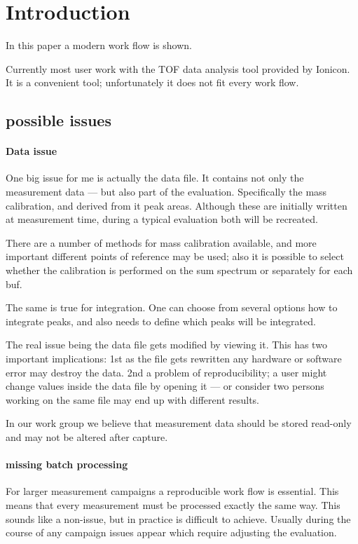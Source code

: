 \section{Introduction}

In this paper a modern work flow is shown.

Currently most user work with the TOF data analysis tool
\citep{Muller2013a} provided by Ionicon.  It is a convenient tool;
unfortunately it does not fit every work flow.

\subsection{possible issues}
\paragraph{Data issue}

One big issue for me is actually the data file.  It contains not only
the measurement data --- but also part of the evaluation.  Specifically
the mass calibration, and derived from it peak areas.   Although these
are initially written at measurement time, during a typical evaluation
both will be recreated.  

There are a number of methods for mass calibration available, and more
important different points of reference may be used; also it is possible
to select whether the calibration is performed on the sum spectrum or
separately for each buf. 

The same is true for integration.  One can choose from several options
how to integrate peaks, and also needs to define which peaks will be
integrated. 

The real issue being the data file gets modified by viewing it.  This
has two important implications: 1st as the file gets rewritten any
hardware or software error may destroy the data.  2nd a problem of
reproducibility; a user might change values inside the data file by
opening it --- or consider two persons working on the same file may end
up with different results.

In our work group we believe that measurement data should be stored
read-only and may not be altered after capture.


\paragraph{missing batch processing}

For larger measurement campaigns a reproducible work flow is essential.
This means that every measurement must be processed exactly the same
way.  This sounds like a non-issue, but in practice is difficult to
achieve.  Usually during the course of any campaign issues appear which
require adjusting the evaluation.

